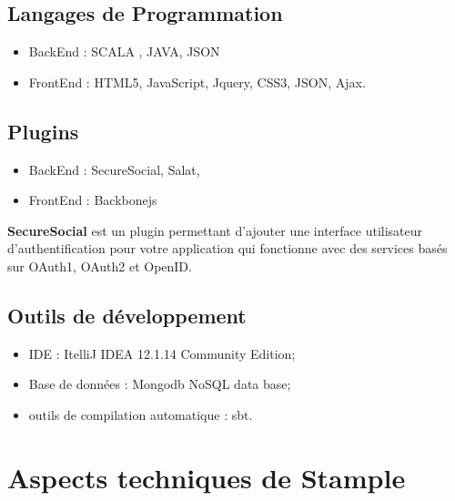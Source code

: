 \subsection{Langages de Programmation}
\begin{itemize}
\item BackEnd : SCALA , JAVA, JSON
\item FrontEnd : HTML5, JavaScript, Jquery, CSS3, JSON, Ajax. 
\end{itemize}
\subsection{Plugins}
\begin{itemize}
\item BackEnd : SecureSocial, Salat, 
\item FrontEnd : Backbonejs 
\end{itemize}
\textbf{SecureSocial} est un plugin permettant d'ajouter une interface utilisateur d'authentification pour votre application qui fonctionne avec des services basés sur OAuth1, OAuth2 et OpenID.
\subsection{Outils de développement}
\begin{itemize}
\item IDE : ItelliJ IDEA 12.1.14 Community Edition;
\item Base de données : Mongodb NoSQL data base;
\item outils de compilation automatique : sbt.
\end{itemize}
\section{Aspects techniques de Stample}
